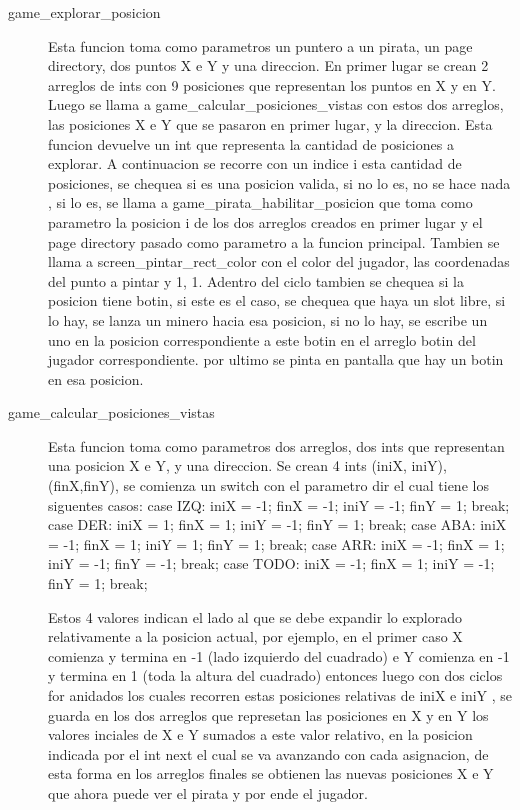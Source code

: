 \begin{description}
\item[game_explorar_posicion]
  Esta funcion toma como parametros un puntero a un pirata, un page directory, dos puntos X e Y y una direccion.
  En primer lugar se crean 2 arreglos de ints con 9 posiciones que representan los puntos en X y en Y.
  Luego se llama a game_calcular_posiciones_vistas con estos dos arreglos, las posiciones X e Y que se pasaron
  en primer lugar, y la direccion. Esta funcion devuelve un int que representa la cantidad de posiciones a explorar.
  A continuacion se recorre con un indice i esta cantidad de posiciones, se chequea si es una posicion valida, si no lo es, no se hace nada
  , si lo es, se llama a game_pirata_habilitar_posicion que toma como parametro la posicion i de los dos arreglos
  creados en primer lugar y el page directory pasado como parametro a la funcion principal.
  Tambien se llama a screen_pintar_rect_color con el color del jugador, las coordenadas del punto a pintar y 1, 1.
  Adentro del ciclo tambien se chequea si la posicion tiene botin, si este es el caso, se chequea que haya un slot
  libre, si lo hay, se lanza un minero hacia esa posicion, si no lo hay, se escribe un uno en la posicion
  correspondiente a este botin en el arreglo botin del jugador correspondiente. por ultimo se pinta
  en pantalla que hay un botin en esa posicion.


\item[game_calcular_posiciones_vistas]
Esta funcion toma como parametros dos arreglos, dos ints que representan una posicion X e Y, y una direccion.
Se crean 4 ints (iniX, iniY), (finX,finY), se comienza un switch con el parametro dir
el cual tiene los siguentes casos:
  case IZQ:  iniX = -1; finX = -1; iniY = -1; finY =  1; break;
  case DER:  iniX =  1; finX =  1; iniY = -1; finY =  1; break;
  case ABA:  iniX = -1; finX =  1; iniY =  1; finY =  1; break;
  case ARR:  iniX = -1; finX =  1; iniY = -1; finY = -1; break;
  case TODO: iniX = -1; finX =  1; iniY = -1; finY =  1; break;

Estos 4 valores indican el lado al que se debe expandir lo explorado relativamente
a la posicion actual, por ejemplo, en el primer caso
X comienza y termina en -1 (lado izquierdo del cuadrado) e Y comienza en -1 y termina en 1 (toda la altura del cuadrado)
entonces luego con dos ciclos for anidados los cuales recorren estas posiciones relativas de iniX e iniY
, se guarda en los dos arreglos que represetan las posiciones en X
y en Y los valores inciales de X e Y sumados a este valor relativo, en la posicion indicada por
el int next el cual se va avanzando con cada asignacion, de esta forma en los arreglos finales
se obtienen las nuevas posiciones X e Y que ahora puede ver el pirata y por ende el jugador.


\end{description}
